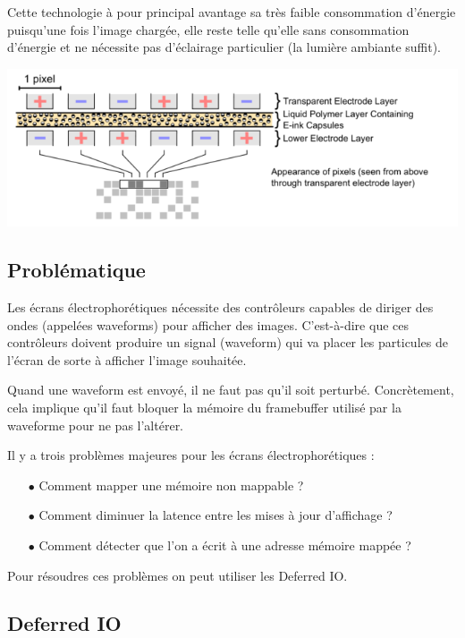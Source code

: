 Cette technologie à pour principal avantage sa très faible consommation d'énergie puisqu'une fois l'image chargée, elle reste telle qu'elle sans consommation d'énergie et ne nécessite pas d'éclairage particulier (la lumière ambiante suffit).

\begin{center}
	\includegraphics{Electrophoretic.png}
\end{center}


\subsection{Problématique}

Les écrans électrophorétiques nécessite des contrôleurs capables de diriger des ondes (appelées waveforms) pour afficher des images. C'est-à-dire que ces contrôleurs doivent produire un signal (waveform) qui va placer les particules de l'écran de sorte à afficher l'image souhaitée.

Quand une waveform est envoyé, il ne faut pas qu'il soit perturbé. Concrètement, cela implique qu'il faut bloquer la mémoire du framebuffer utilisé par la waveforme pour ne pas l'altérer.

Il y a trois problèmes majeures pour les écrans électrophorétiques :
\begin{itemize}
	\item[$\bullet$] Comment mapper une mémoire non mappable ?
	\item[$\bullet$] Comment diminuer la latence entre les mises à jour d'affichage ?
	\item[$\bullet$] Comment détecter que l'on a écrit à une adresse mémoire mappée ?
\end{itemize}

Pour résoudres ces problèmes on peut utiliser les Deferred IO.

\subsection{Deferred IO}

